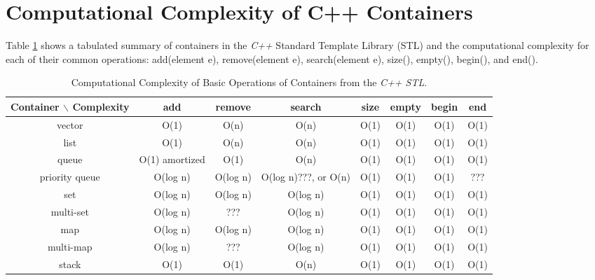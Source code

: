 \section{Computational Complexity of C++ Containers}
\label{sec:ComputationalComplexityofCppContainers}


	Table \ref{tab:ComputationalComplexityofCppContainers} shows a tabulated summary of containers in the {\it C++} Standard Template Library (STL) and the computational complexity for each of their common operations: add(element e), remove(element e), search(element e), size(), empty(), begin(), and end(). \\

\begin{table}[htp]
\caption{Computational Complexity of Basic Operations of Containers from the {\it C++ STL}.}	\vspace{-0.2in}
\label{tab:ComputationalComplexityofCppContainers}
	\begin{center}
		\begin{tabular}{|c|c|c|c|c|c|c|c|}
		\hline
		Container $\backslash$ Complexity & add & remove & search & size & empty & begin & end \\
		\hline
		vector & O(1) & O(n) & O(n) & O(1) & O(1) & O(1) & O(1) \\
		\hline
		list & O(1) & O(n) & O(n) & O(1) & O(1) & O(1) & O(1) \\
		\hline
		queue & O(1) amortized & O(1) & O(n) & O(1) & O(1) & O(1) & O(1) \\
		\hline
		priority queue & O(log n) & O(log n) & O(log n)???, or O(n) & O(1) & O(1) & O(1) & ??? \\
		\hline
		set & O(log n) & O(log n) & O(log n) & O(1) & O(1) & O(1) & O(1) \\
		\hline
		multi-set & O(log n) & ??? & O(log n) & O(1) & O(1) & O(1) & O(1) \\
		\hline
		map & O(log n) & O(log n) & O(log n) & O(1) & O(1) & O(1) & O(1) \\
		\hline
		multi-map & O(log n) & ??? & O(log n) & O(1) & O(1) & O(1) & O(1) \\
		\hline
		stack & O(1) & O(1) & O(n) & O(1) & O(1) & O(1) & O(1) \\
		\hline
		\end{tabular}
	\end{center}
\end{table}


